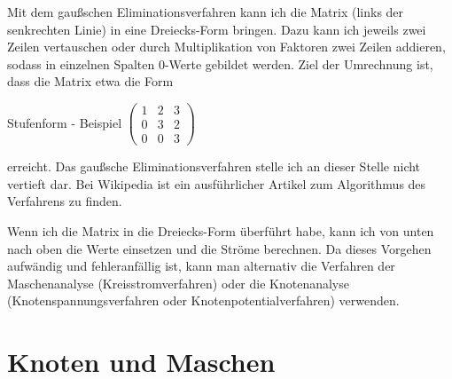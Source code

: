 \documentclass[aspectratio=169, ignorenonframetext]{beamer}
\begin{document}




Mit dem gaußschen Eliminationsverfahren kann ich die Matrix (links der senkrechten Linie) in eine Dreiecks-Form bringen. Dazu kann ich jeweils zwei Zeilen vertauschen oder durch Multiplikation von Faktoren zwei Zeilen addieren, sodass in einzelnen Spalten 0-Werte gebildet werden. Ziel der Umrechnung ist, dass die Matrix etwa die Form

\begin{frame}{Stufenform - Beispiel}
$\left(
\begin{array}{rrr}
 1 & 2 & 3 \\
 0 & 3 & 2 \\
 0 & 0 & 3
\end{array}
\right)$
\end{frame}

erreicht. Das gaußsche Eliminationsverfahren stelle ich an dieser Stelle nicht vertieft dar. Bei Wikipedia ist ein ausführlicher Artikel zum Algorithmus des Verfahrens zu finden.

Wenn ich die Matrix in die Dreiecks-Form überführt habe, kann ich von unten nach oben die Werte einsetzen und die Ströme berechnen. Da dieses Vorgehen aufwändig und fehleranfällig ist, kann man alternativ die Verfahren der Maschenanalyse (Kreisstromverfahren) oder die Knotenanalyse (Knotenspannungsverfahren oder Knotenpotentialverfahren) verwenden.
\section{Knoten und Maschen}
\end{document}
